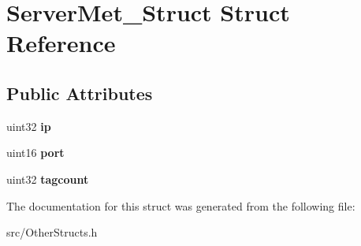 \section{ServerMet\_\-Struct Struct Reference}
\label{structServerMet__Struct}
\subsection*{Public Attributes}
\begin{DoxyCompactItemize}
\item 
uint32 {\bfseries ip}\label{structServerMet__Struct_ae2056b839023e3ff5202d8501cc7b3a9}

\item 
uint16 {\bfseries port}\label{structServerMet__Struct_a29d0aaa5654f30099a14becc8b615cac}

\item 
uint32 {\bfseries tagcount}\label{structServerMet__Struct_abf55f5f1dc751df943fabe98eff0f810}

\end{DoxyCompactItemize}


The documentation for this struct was generated from the following file:\begin{DoxyCompactItemize}
\item 
src/OtherStructs.h\end{DoxyCompactItemize}
